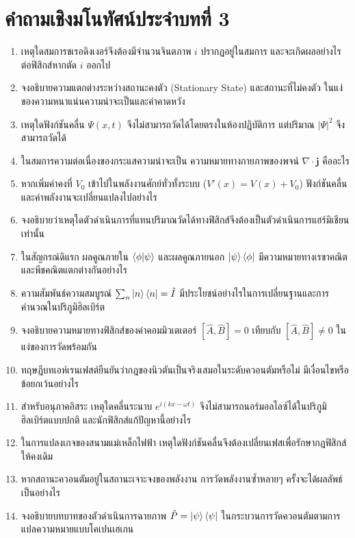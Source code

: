 \section{คำถามเชิงมโนทัศน์ประจำบทที่ 3}

\begin{enumerate}
    \item เหตุใดสมการชเรอดิงเงอร์จึงต้องมีจำนวนจินตภาพ $i$ ปรากฏอยู่ในสมการ และจะเกิดผลอย่างไรต่อฟิสิกส์หากตัด $i$ ออกไป
    \item จงอธิบายความแตกต่างระหว่างสถานะคงตัว (Stationary State) และสถานะที่ไม่คงตัว ในแง่ของความหนาแน่นความน่าจะเป็นและค่าคาดหวัง
    \item เหตุใดฟังก์ชันคลื่น $\Psi(x, t)$ จึงไม่สามารถวัดได้โดยตรงในห้องปฏิบัติการ แต่ปริมาณ $|\Psi|^2$ จึงสามารถวัดได้
    \item ในสมการความต่อเนื่องของกระแสความน่าจะเป็น ความหมายทางกายภาพของพจน์ $\nabla\cdot\mathbf{j}$ คืออะไร
    \item หากเพิ่มค่าคงที่ $V_0$ เข้าไปในพลังงานศักย์ทั่วทั้งระบบ ($V'(x) = V(x) + V_0$) ฟังก์ชันคลื่นและค่าพลังงานจะเปลี่ยนแปลงไปอย่างไร
    \item จงอธิบายว่าเหตุใดตัวดำเนินการที่แทนปริมาณวัดได้ทางฟิสิกส์จึงต้องเป็นตัวดำเนินการแฮร์มิเชียนเท่านั้น
    \item ในสัญกรณ์ดิแรก ผลคูณภายใน $\braket{\phi}{\psi}$ และผลคูณภายนอก $\ket{\psi}\bra{\phi}$ มีความหมายทางเรขาคณิตและพีชคณิตแตกต่างกันอย่างไร
    \item ความสัมพันธ์ความสมบูรณ์ $\sum_n \ket{n}\bra{n} = \hat{I}$ มีประโยชน์อย่างไรในการเปลี่ยนฐานและการคำนวณในปริภูมิฮิลเบิร์ต
    \item จงอธิบายความหมายทางฟิสิกส์ของค่าคอมมิวเตเตอร์ $[\hat{A}, \hat{B}] = 0$ เทียบกับ $[\hat{A}, \hat{B}] \ne 0$ ในแง่ของการวัดพร้อมกัน
    \item ทฤษฎีบทเอห์เรนเฟสต์ยืนยันว่ากฎของนิวตันเป็นจริงเสมอในระดับควอนตัมหรือไม่ มีเงื่อนไขหรือข้อยกเว้นอย่างไร
    \item สำหรับอนุภาคอิสระ เหตุใดคลื่นระนาบ $e^{i(kx-\omega t)}$ จึงไม่สามารถนอร์มอลไลซ์ได้ในปริภูมิฮิลเบิร์ตแบบปกติ และนักฟิสิกส์แก้ปัญหานี้อย่างไร
    \item ในการแปลงเกจของสนามแม่เหล็กไฟฟ้า เหตุใดฟังก์ชันคลื่นจึงต้องเปลี่ยนเฟสเพื่อรักษากฎฟิสิกส์ให้คงเดิม
    \item หากสถานะควอนตัมอยู่ในสถานะเจาะจงของพลังงาน การวัดพลังงานซ้ำหลายๆ ครั้งจะได้ผลลัพธ์เป็นอย่างไร
    \item จงอธิบายบทบาทของตัวดำเนินการฉายภาพ $\hat{P} = \ket{\psi}\bra{\psi}$ ในกระบวนการวัดควอนตัมตามการแปลความหมายแบบโคเปนเฮเกน

\end{enumerate}
